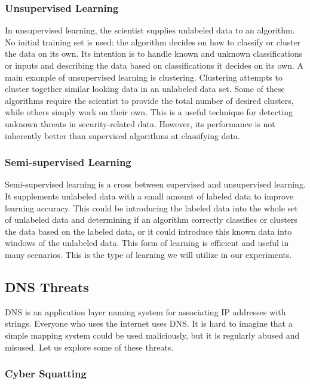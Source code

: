 \subsubsection{Unsupervised Learning}

In unsupervised learning, the scientist supplies unlabeled data to an algorithm.
No initial training set is used: the algorithm decides on how to classify or cluster the data on
its own.
Its intention is to handle known and unknown classifications or inputs and describing the data based
on classifications it decides on its own.
A main example of unsupervised learning is clustering.
Clustering attempts to cluster together similar looking data in an unlabeled data set.
Some of these algorithms require the scientist to provide the total number of desired clusters, while
others simply work on their own.
This is a useful technique for detecting unknown threats in security-related data.
However, its performance is not inherently better than supervised algorithms at classifying data.

\subsubsection{Semi-supervised Learning}

Semi-supervised learning is a cross between supervised and unsupervised learning.
It supplements unlabeled data with a small amount of labeled data to improve learning accuracy.
This could be introducing the labeled data into the whole set of unlabeled data and determining if
an algorithm correctly classifies or clusters the data based on the labeled data, or it could
introduce this known data into windows of the unlabeled data.
This form of learning is efficient and useful in many scenarios.
This is the type of learning we will utilize in our experiments.

\subsection{DNS Threats}

DNS is an application layer naming system for associating IP addresses with strings.
Everyone who uses the internet uses DNS\@.
It is hard to imagine that a simple mapping system could be used maliciously, but it is regularly
abused and misused.
Let us explore some of these threats.

\subsubsection{Cyber Squatting}

